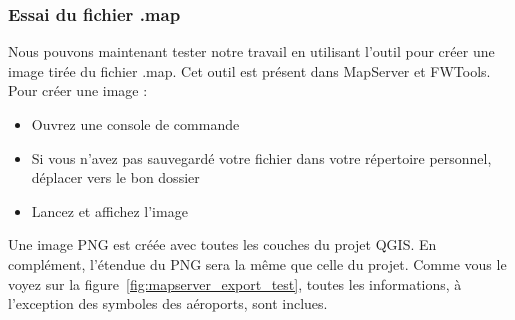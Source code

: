 %

\subsubsection{Essai du fichier .map}

Nous pouvons maintenant tester notre travail en utilisant l'outil  pour créer une image tirée du fichier .map. Cet outil est présent dans MapServer et FWTools. 
Pour créer une image :

% 

\begin{itemize}
\item Ouvrez une console de commande
\item Si vous n'avez pas sauvegardé votre fichier dans votre répertoire personnel, déplacer vers le bon dossier
\item Lancez  et affichez l'image
\end{itemize}
 
Une image PNG est créée avec toutes les couches du projet QGIS. En complément, l'étendue du PNG sera la même que celle du projet. Comme vous le voyez sur la figure~\ref{fig:mapserver_export_test}, toutes les informations, à l'exception des symboles des aéroports, sont inclues.

